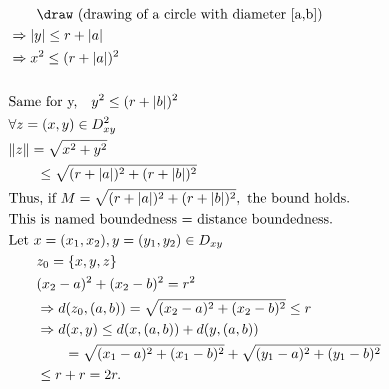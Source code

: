 \documentclass{article}
\theoremstyle{definition}
\numberwithin{equation}{section}
\begin{document}
\begin{align*}
&\quad\quad \draw \text{ (drawing of a circle with diameter [a,b])} \\
&\Rightarrow |y| \leq r + |a| \\
&\Rightarrow x^2 \leq (r + |a|)^2 \\
& \\
& \text{Same for y,} \quad y^2 \leq (r + |b|)^2 \\
& \forall z = (x, y) \in D^2_{xy} \\
& \| z \| = \sqrt{x^2 + y^2} \\
& \quad\quad \leq \sqrt{(r + |a|)^2 + (r + |b|)^2} \\
& \text{Thus, if } M = \sqrt{(r + |a|)^2 + (r + |b|)^2}, \text{ the bound holds.} \\
& \text{This is named boundedness = distance boundedness.} \\
& \text{Let } x = (x_1, x_2), y = (y_1, y_2) \in D_{xy} \\
& \quad\quad z_0 = \{ x, y, z \} \\
& \quad\quad (x_2 - a)^2 + (x_2 - b)^2 = r^2 \\
& \quad\quad \Rightarrow d(z_0, (a, b)) = \sqrt{(x_2 - a)^2 + (x_2 - b)^2} \leq r \\
& \quad\quad \Rightarrow d(x, y) \leq d(x, (a, b)) + d(y, (a, b))  \\
& \quad\quad \quad\quad = \sqrt{(x_1 - a)^2 + (x_1 - b)^2} + \sqrt{(y_1 - a)^2 + (y_1 - b)^2} \\
& \quad\quad \leq r + r = 2r.
\end{align*}
\end{document}

